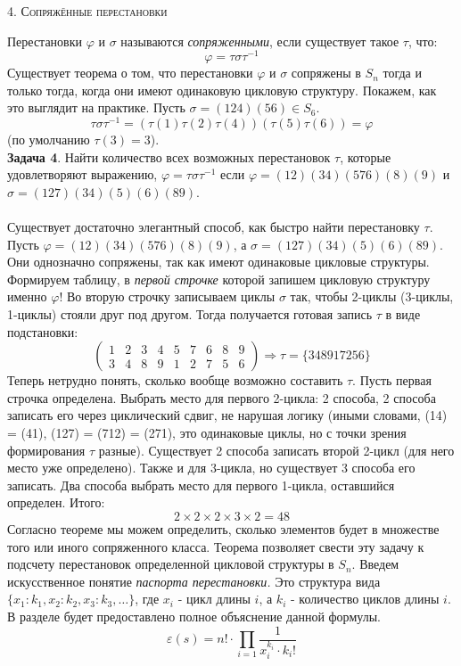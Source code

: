 \documentclass[a4paper,12pt]{article}
\begin{document}
\begin{center}
    \textsc{4. Сопряжённые перестановки}
\end{center}
Перестановки $\varphi$ и $\sigma$ называются \textit{сопряженными}, если существует такое $\tau$, что:
\[\varphi = \tau \sigma \tau^{-1}\]
Существует теорема о том, что перестановки $\varphi$ и $\sigma$ сопряжены в $S_n$ тогда и только тогда, когда они имеют одинаковую цикловую структуру. Покажем, как это выглядит на практике. Пусть $\sigma = (124)(56) \in S_6$.
\[\tau \sigma \tau^{-1} = (\tau(1)\tau(2)\tau(4))(\tau(5)\tau(6)) = \varphi \]
(по умолчанию $\tau(3) = 3$). \\
\textbf{Задача 4}. Найти количество всех возможных перестановок $\tau$, которые удовлетворяют выражению, $\varphi = \tau \sigma \tau^{-1}$  если $\varphi = (12)(34)(576)(8)(9)$ и $\sigma = (127)(34)(5)(6)(89)$. \\
\\
Существует достаточно элегантный способ, как быстро найти перестановку $\tau$. Пусть $\varphi = (12)(34)(576)(8)(9)$, а $\sigma = (127)(34)(5)(6)(89)$. Они однозначно сопряжены, так как имеют одинаковые цикловые структуры. Формируем таблицу, в \textit{первой строчке} которой запишем цикловую структуру именно $\varphi$! Во вторую строчку записываем циклы $\sigma$ так, чтобы 2-циклы (3-циклы, 1-циклы) стояли друг под другом. Тогда получается готовая запись $\tau$ в виде подстановки:
\[\begin{pmatrix}
1 & 2 & 3 & 4 & 5 & 7 & 6 & 8 & 9 \\
3 & 4 & 8 & 9 & 1 & 2 & 7 & 5 & 6 
\end{pmatrix} \Rightarrow \tau = \{348917256\} \]
Теперь нетрудно понять, сколько вообще возможно составить $\tau$. Пусть первая строчка определена. Выбрать место для первого 2-цикла: 2 способа, 2 способа записать его через циклический сдвиг, не нарушая логику (иными словами, (14) = (41), (127) = (712) = (271), это одинаковые циклы, но с точки зрения формирования $\tau$ разные). Существует 2 способа записать второй 2-цикл (для него место уже определено). Также и для 3-цикла, но существует 3 способа его записать. Два способа выбрать место для первого 1-цикла, оставшийся определен. Итого:
\[ 2 \times 2 \times 2 \times 3 \times 2 = 48 \] 
Согласно теореме мы можем определить, сколько элементов будет в множестве того или иного сопряженного класса. Теорема позволяет свести эту задачу к подсчету перестановок определенной цикловой структуры в $S_n$. Введем искусственное понятие \textit{паспорта перестановки.} Это структура вида $\{x_1: k_1, x_2: k_2, x_3: k_3, \dots \}$, где $x_i$ - цикл длины $i$, а $k_i$ - количество циклов длины $i$. В разделе будет предоставлено полное объяснение данной формулы.
\[ \boxed{\varepsilon(s) =  n! \cdot \prod_{i=1} \frac{1}{x_i^{k_i}\cdot k_i!}} \]
\end{document}
